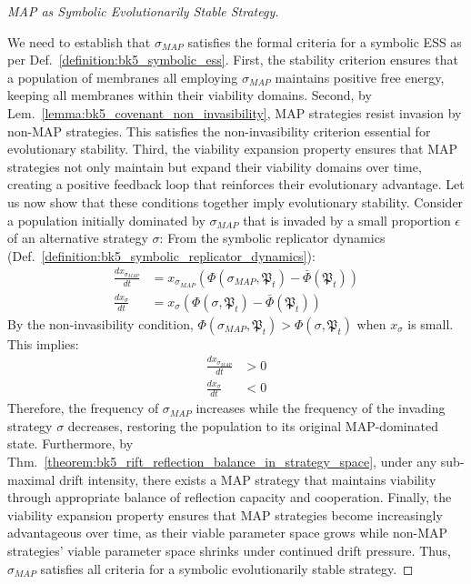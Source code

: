 \begin{proof}[MAP as Symbolic Evolutionarily Stable Strategy]
\label{proof:bk5_map_as_ess}
\leavevmode

We need to establish that $\sigma_{MAP}$ satisfies the formal criteria for a symbolic ESS as per Def.~\ref{definition:bk5_symbolic_ess}.
First, the stability criterion ensures that a population of membranes all employing $\sigma_{MAP}$ maintains positive free energy, keeping all membranes within their viability domains.
Second, by Lem.~\ref{lemma:bk5_covenant_non_invasibility}, MAP strategies resist invasion by non-MAP strategies. This satisfies the non-invasibility criterion essential for evolutionary stability.
Third, the viability expansion property ensures that MAP strategies not only maintain but expand their viability domains over time, creating a positive feedback loop that reinforces their evolutionary advantage.
Let us now show that these conditions together imply evolutionary stability. Consider a population initially dominated by $\sigma_{MAP}$ that is invaded by a small proportion $\epsilon$ of an alternative strategy $\sigma$:
From the symbolic replicator dynamics (Def.~\ref{definition:bk5_symbolic_replicator_dynamics}):
\begin{align}
\frac{dx_{\sigma_{MAP}}}{dt} &= x_{\sigma_{MAP}} \left( \Phi(\sigma_{MAP}, \mathfrak{P}_t) - \bar{\Phi}(\mathfrak{P}_t) \right) \\
\frac{dx_\sigma}{dt} &= x_\sigma \left( \Phi(\sigma, \mathfrak{P}_t) - \bar{\Phi}(\mathfrak{P}_t) \right)
\end{align}
By the non-invasibility condition, $\Phi(\sigma_{MAP}, \mathfrak{P}_t) > \Phi(\sigma, \mathfrak{P}_t)$ when $x_\sigma$ is small. This implies:
\begin{align}
\frac{dx_{\sigma_{MAP}}}{dt} &> 0 \\
\frac{dx_\sigma}{dt} &< 0
\end{align}
Therefore, the frequency of $\sigma_{MAP}$ increases while the frequency of the invading strategy $\sigma$ decreases, restoring the population to its original MAP-dominated state.
Furthermore, by Thm.~\ref{theorem:bk5_rift_reflection_balance_in_strategy_space}, under any sub-maximal drift intensity, there exists a MAP strategy that maintains viability through appropriate balance of reflection capacity and cooperation.
Finally, the viability expansion property ensures that MAP strategies become increasingly advantageous over time, as their viable parameter space grows while non-MAP strategies' viable parameter space shrinks under continued drift pressure.
Thus, $\sigma_{MAP}$ satisfies all criteria for a symbolic evolutionarily stable strategy.
\end{proof}
